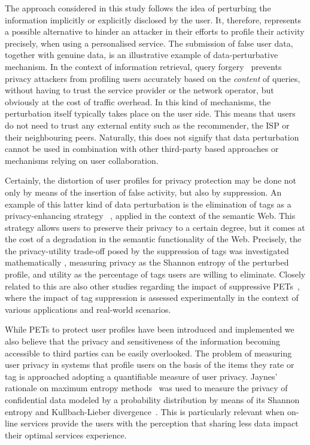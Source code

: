 The approach considered in this study follows the idea of perturbing the information implicitly or explicitly disclosed by the user. It, therefore, represents a possible alternative to hinder an attacker in their efforts to profile their activity precisely, when using a personalised service. The submission of false user data, together with genuine data, is an illustrative example of data-perturbative mechanism. In the context of information retrieval, query forgery~\cite{Rebollo10IT, parra2014optimal, rebollo2010optimized, parra2012privacy} prevents privacy attackers from profiling users accurately based on the \emph{content} of queries, without having to trust the service provider or the network operator, but obviously at the cost of traffic overhead. In this kind of mechanisms, the perturbation itself typically takes place on the user side. This means that users do not need to trust any external entity such as the recommender, the ISP or their neighbouring peers. Naturally, this does not signify that data perturbation cannot be used in combination with other third-party based approaches or mechanisms relying on user collaboration.

Certainly, the distortion of user profiles for privacy protection may be done not only by means of the insertion of false activity, but also by suppression. An example of this latter kind of data perturbation is the elimination of tags as a privacy-enhancing strategy ~\cite{Parra10TB, rebollo2012query, parra2012optimal, Parra13KDE}, applied in the context of the semantic Web. This strategy allows users to preserve their privacy to a certain degree, but it comes at the cost of a degradation in the semantic functionality of the Web. Precisely, the the privacy-utility trade-off posed by the suppression of tags was investigated mathematically  \cite{Parra12DKE, parra2014measuring, puglisi2015content}, measuring privacy as the Shannon entropy of the perturbed profile, and utility as the percentage of tags users are willing to eliminate. Closely related to this are also other studies regarding the impact of suppressive PETs~\cite{Parra12TKDE, puglisi2015content, parra2016shall}, where the impact of tag suppression is assessed experimentally in the context of various applications and real-world scenarios.

While PETs to protect user profiles have been introduced and implemented we also believe that the privacy and sensitiveness of the information becoming accessible to third parties can be easily overlooked. The problem of measuring user privacy in systems that profile users on the basis of the items they rate or tag is approached adopting a quantifiable measure of user privacy. Jaynes’ rationale on maximum entropy methods~\cite{jaynes1957information,jaynes1982rationale} was used to measure the privacy of confidential data modeled by a probability distribution by means of its Shannon entropy and Kullbach-Lieber divergence~\cite{rodriguez2015entropy, parra2014measuring}. This is particularly relevant when on-line services provide the users with the perception that sharing less data impact their optimal services experience. 

